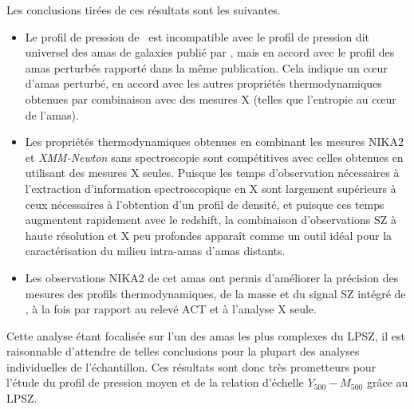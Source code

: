 \vspace{5pt}
Les conclusions tirées de ces résultats sont les suivantes.
\begin{itemize}[leftmargin=*]
\setlength\itemsep{5pt}
\item
    Le profil de pression de \act\ est incompatible avec le profil de pression dit universel des amas de galaxies publié par , mais en accord avec le profil des amas perturbés rapporté dans la même publication.
    Cela indique un cœur d'amas perturbé, en accord avec les autres propriétés thermodynamiques obtenues par combinaison avec des mesures X (telles que l'entropie au cœur de l'amas).

\item
    Les propriétés thermodynamiques obtenues en combinant les mesures NIKA2 et \textit{XMM-Newton} sans spectroscopie sont compétitives avec celles obtenues en utilisant des mesures X seules.
    Puisque les temps d'observation nécessaires à l'extraction d'information spectroscopique en X sont largement supérieurs à ceux nécessaires à l'obtention d'un profil de densité, et puisque ces temps augmentent rapidement avec le redshift, la combinaison d'observations SZ à haute résolution et X peu profondes apparaît comme un outil idéal pour la caractérisation du milieu intra-amas d'amas distants.

\item
    Les observations NIKA2 de cet amas ont permis d'améliorer la précision des mesures des profils thermodynamiques, de la masse et du signal SZ intégré de \act, à la fois par rapport au relevé ACT et à l'analyse X seule.
\end{itemize}

Cette analyse étant focalisée sur l'un des amas les plus complexes du LPSZ, il est raisonnable d'attendre de telles conclusions pour la plupart des analyses individuelles de l'échantillon.
Ces résultats sont donc très prometteurs pour l'étude du profil de pression moyen et de la relation d'échelle $Y_{500}-M_{500}$ grâce au LPSZ.
